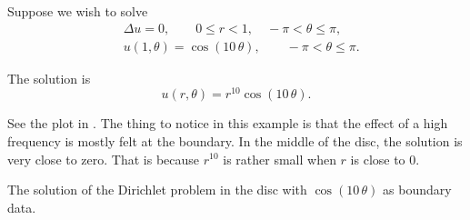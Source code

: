 \begin{example}
Suppose we wish to solve
\begin{align*}
& \Delta u = 0 , \qquad 0 \leq r < 1, \quad -\pi < \theta \leq \pi,\\
& u(1,\theta) = \cos(10\,\theta), \qquad -\pi < \theta \leq \pi.
\end{align*}

The solution is
\begin{equation*}
u(r,\theta) = r^{10} \cos(10\,\theta) .
\end{equation*}

See the plot in .
The thing to notice in this example is that the effect of a high frequency
is mostly felt at the boundary.  In the middle of the disc, the solution
is very close to zero.  That is because $r^{10}$ is rather small when $r$
is close to 0.
\begin{myfig}
\capstart
{}
\caption{The solution of the Dirichlet problem in the disc with
$\cos(10\,\theta)$ as boundary data.\label{dirichdisc:tenspeedfig}}
\end{myfig}
\end{example}

